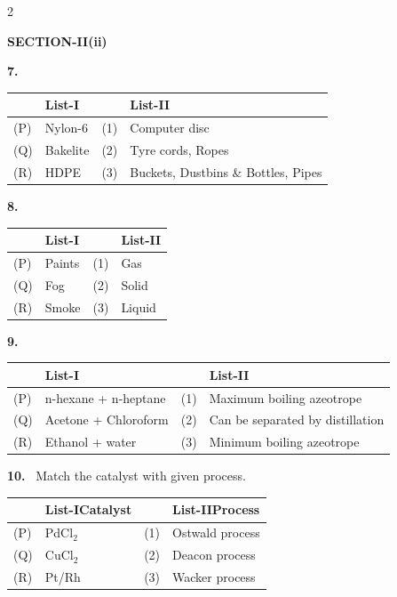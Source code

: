 \documentclass[10pt]{extarticle}
\newcommand{\sect}[1]{\par\smallskip\noindent\textbf{#1}\par}
\newcommand{\qn}[1]{\par\smallskip\noindent\textbf{#1.}~}
\begin{document}
\begin{multicols}{2}
\sect{SECTION-II(ii)}
\qn{7} \begin{tabular}[t]{|p{0.65cm}|p{1.6cm}|p{0.65cm}|p{3.8cm}|}
\hline
 & \centering List-I & & \centering List-II\tabularnewline
\hline
(P) & Nylon-6 & (1) & Computer disc\\
(Q) & Bakelite & (2) & Tyre cords, Ropes\\
(R) & HDPE & (3) & Buckets, Dustbins \& Bottles, Pipes\\
\hline
\end{tabular}

\qn{8} \begin{tabular}[t]{|p{0.6cm}|p{2.0cm}|p{0.6cm}|p{2.0cm}|}
\hline
 & \centering List-I & & \centering List-II\tabularnewline
\hline
(P) & Paints & (1) & Gas\\
(Q) & Fog & (2) & Solid\\
(R) & Smoke & (3) & Liquid\\
\hline
\end{tabular}

\qn{9} \begin{tabular}[t]{|p{0.65cm}|p{2.4cm}|p{0.65cm}|p{2.8cm}|}
\hline
 & \centering List-I & & \centering List-II\tabularnewline
\hline
(P) & n-hexane + n-heptane & (1) & Maximum boiling azeotrope\\
(Q) & Acetone + Chloroform & (2) & Can be separated by distillation\\
(R) & Ethanol + water & (3) & Minimum boiling azeotrope\\
\hline
\end{tabular}

\qn{10} Match the catalyst with given process.
\begin{center}\footnotesize
\begin{tabular}{|p{0.6cm}|p{2.0cm}|p{0.6cm}|p{3.0cm}|}
\hline
 & \centering List-I\newline Catalyst & & \centering List-II\newline Process\tabularnewline
\hline
(P) & PdCl$_2$ & (1) & Ostwald process\\
(Q) & CuCl$_2$ & (2) & Deacon process\\
(R) & Pt/Rh & (3) & Wacker process\\
\hline
\end{tabular}
\end{center}


\end{multicols}
\end{document}
